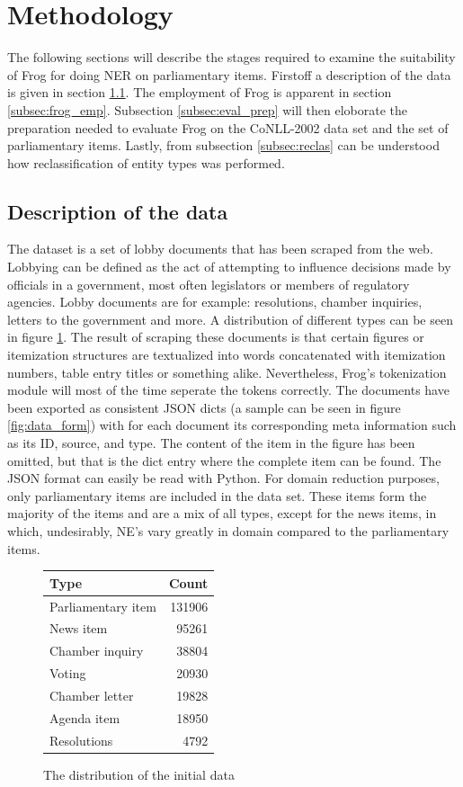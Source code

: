 \section{Methodology}
\label{sec:meth}
The following sections will describe the stages required to examine the suitability of Frog for doing NER on parliamentary items. Firstoff a description of the data is given in section \ref{subsec:data}. The employment of Frog is apparent in section \ref{subsec:frog_emp}. Subsection \ref{subsec:eval_prep} will then eloborate the preparation needed to evaluate Frog on the CoNLL-2002 data set and the set of parliamentary items. Lastly, from subsection \ref{subsec:reclas} can be understood how reclassification of entity types was performed. 

\subsection{Description of the data}\label{subsec:data}
The dataset is a set of lobby documents that has been scraped from the web. Lobbying can be defined as the act of attempting to influence decisions made by officials in a government, most often legislators or members of regulatory agencies. Lobby documents are for example: resolutions, chamber inquiries, letters to the government and more. A distribution of different types can be seen in figure \ref{fig:data_dis}. The result of scraping these documents is that certain figures or itemization structures are textualized into words concatenated with itemization numbers, table entry titles or something alike. Nevertheless, Frog's tokenization module will most of the time seperate the tokens correctly.  The documents have been exported as consistent JSON dicts (a sample can be seen in figure \ref{fig:data_form}) with for each document its corresponding meta information such as its ID, source, and type. The content of the item in the figure has been omitted, but that is the dict entry where the complete item can be found. The JSON format can easily be read with Python. For domain reduction purposes, only parliamentary items are included in the data set. These items form the majority of the items and are a mix of all types, except for the news items, in which, undesirably, NE's vary greatly in domain compared to the parliamentary items.

\begin{figure} \label{fig:data_dis}
\centering
\begin{tabular}{l|r}
Type              & Count \\
\hline
Parliamentary item & 131906  \\
News item & 95261 \\
Chamber inquiry & 38804  \\
Voting & 20930 \\
Chamber letter & 19828 \\
Agenda item & 18950  \\
Resolutions & 4792 \\
\end{tabular}
\caption{The distribution of the initial data}
\end{figure}

